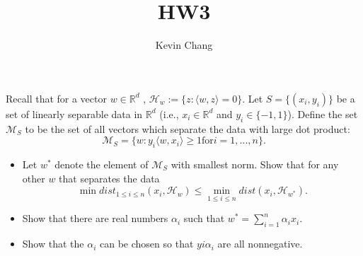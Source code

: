 \documentclass[a4paper]{article}
\title{HW3}
\author{Kevin Chang}
\begin{document}
\maketitle

\section{}
Recall that for a vector $w \in \mathbb{R}^d$ , $\mathcal{H}_w := \{z : ⟨w, z⟩ = 0\}$.
Let $S = \{(x_i , y_i )\}$ be a set of linearly separable data in $\mathbb{R}^d$ (i.e., $x_i \in \mathbb{R}^d$ and $y_i \in \{-1, 1\}$).
Define the set $\mathcal{M}_S$ to be the set of all vectors which separate the data with large dot product:
$$\mathcal{M}_S = \{w : y_i ⟨w, x_i ⟩ \geq 1 \text{for} i = 1, . . . , n\}.$$
\begin{itemize}
    \item Let $w^*$ denote the element of $\mathcal{M}_S$ with smallest norm.
Show that for any other $w$ that separates the data $$\min \mathit{dist}_{1\leq i\leq n}(x_i , \mathcal{H}_w ) \leq \min_{1\leq i\leq n} \mathit{dist}(x_i , \mathcal{H}_{w^*}) .$$
    \item Show that there are real numbers $\alpha_i$ such that $w^* = \sum_{i=1}^n \alpha_i x_i$.
    \item Show that the $\alpha_i$ can be chosen so that $yi \alpha_i$ are all nonnegative.
\end{itemize}
\end{document}
